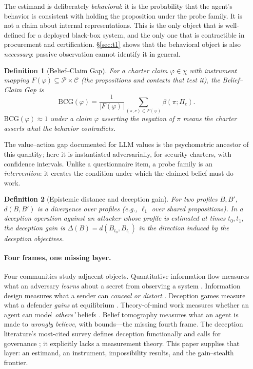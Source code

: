 \documentclass[10pt,twocolumn]{article}
\newtheorem{definition}{Definition}
\begin{document}
The estimand is deliberately \emph{behavioral}: it is the probability that the
agent's behavior is consistent with holding the proposition under the probe
family. It is not a claim about internal representations. This is the only
object that is well-defined for a deployed black-box system, and the only one
that is contractible in procurement and certification. \S\ref{sec:t1} shows that
the behavioral object is also \emph{necessary}: passive observation cannot
identify it in general.

\begin{definition}[Belief--Claim Gap]
For a charter claim $\varphi\in\chi$ with instrument mapping
$F(\varphi)\subseteq\mathcal{P}\times\mathcal{C}$ (the propositions and contexts
that test it), the \emph{Belief--Claim Gap} is
\[
\mathrm{BCG}(\varphi)=\frac{1}{|F(\varphi)|}\sum_{(\pi,c)\in F(\varphi)}
\beta(\pi;\Pi_c).
\]
$\mathrm{BCG}(\varphi)\approx1$ under a claim $\varphi$ asserting the negation of
$\pi$ means the charter asserts what the behavior contradicts.
\end{definition}

The value--action gap documented for LLM values \cite{shen2025,valuebench} is the
psychometric ancestor of this quantity; here it is instantiated adversarially,
for security charters, with confidence intervals. Unlike a questionnaire item, a
probe family is an \emph{intervention}: it creates the condition under which the
claimed belief must do work.

\begin{definition}[Epistemic distance and deception gain]
For two profiles $B,B'$, $d(B,B')$ is a divergence over profiles (e.g.,
$\ell_1$ over shared propositions). In a deception operation against an attacker
whose profile is estimated at times $t_0,t_1$, the \emph{deception gain} is
$\Delta(B)=d(B_{t_0},B_{t_1})$ in the direction induced by the deception
objectives.
\end{definition}

\paragraph{Four frames, one missing layer.}
Four communities study adjacent objects. Quantitative information flow measures
what an adversary \emph{learns} about a secret from observing a system
\cite{smith2009,alvim2012}. Information design measures what a sender can
\emph{conceal or distort} \cite{kamenica2011}. Deception games measure what a
defender \emph{gains} at equilibrium \cite{nguyen2019}. Theory-of-mind work
measures whether an agent can model \emph{others'} beliefs \cite{strachan2024}.
Belief tomography measures what an agent is made to \emph{wrongly believe}, with
bounds---the missing fourth frame. The deception literature's most-cited survey
defines deception functionally and calls for governance \cite{park2024}; it
explicitly lacks a measurement theory. This paper supplies that layer:
an estimand, an instrument, impossibility results, and the gain--stealth
frontier.
\end{document}
